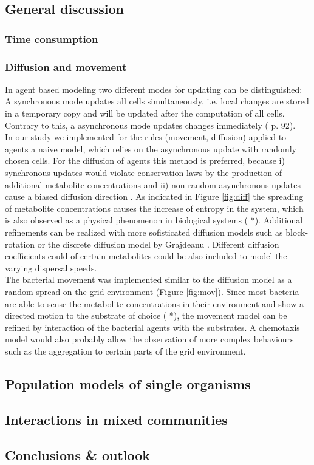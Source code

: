 \subsection{General discussion}
\subsubsection{Time consumption}
\subsubsection{Diffusion and movement}
In agent based modeling two different modes for updating can be distinguished:
A synchronous mode updates all cells simultaneously, i.e. local changes are stored in a temporary copy and will be updated after the computation of all cells. Contrary to this, a asynchronous mode updates changes immediately (\cite{Matthies2002} p. 92).\\
In our study we implemented for the rules (movement, diffusion) applied to agents a naive model, which relies on the asynchronous update with randomly chosen cells. For the diffusion of agents this method is preferred, because i) synchronous updates would violate conservation laws by the production of additional metabolite concentrations and ii) non-random asynchronous updates cause a biased diffusion direction \cite{Bandman1999}. As indicated in Figure \hyperref[fig:diff]{\ref{fig:diff}} the spreading of metabolite concentrations causes the increase of entropy in the system, which is also observed as a physical phenomenon in biological systems ( *). Additional refinements can be realized with more sofisticated diffusion models such as block-rotation \cite{Bandman1999} or the discrete diffusion model by Grajdeanu \cite{Grajdeanu2007}. Different diffusion coefficients could of certain metabolites could be also included to model the varying dispersal speeds.\\
The bacterial movement was implemented similar to the diffusion model as a random spread on the grid environment (Figure \hyperref[fig:mov]{\ref{fig:mov}}). Since most bacteria are able to sense the metabolite concentrations in their environment and show a directed motion to the substrate of choice ( *), the movement model can be refined by interaction of the bacterial agents with the substrates. A chemotaxis model would also probably allow the observation of more complex behaviours such as the aggregation to certain parts of the grid environment.
\subsection{Population models of single organisms}

\subsection{Interactions in mixed communities}
\subsection{Conclusions \& outlook}
